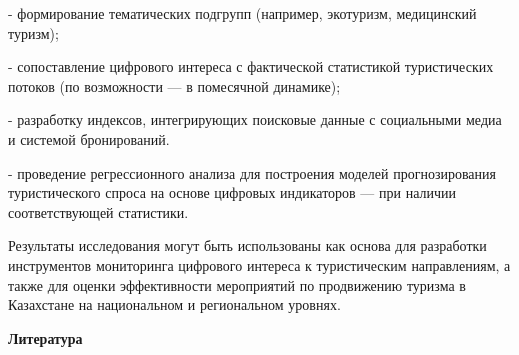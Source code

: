 \begin{multicols}{2}
- формирование тематических подгрупп (например, экотуризм, медицинский
туризм);

- сопоставление цифрового интереса с фактической статистикой
туристических потоков (по возможности --- в помесячной динамике);

- разработку индексов, интегрирующих поисковые данные с социальными
медиа и системой бронирований.

- проведение регрессионного анализа для построения моделей
прогнозирования туристического спроса на основе цифровых индикаторов
--- при наличии соответствующей статистики.

Результаты исследования могут быть использованы как основа для
разработки инструментов мониторинга цифрового интереса к туристическим
направлениям, а также для оценки эффективности мероприятий по
продвижению туризма в Казахстане на национальном и региональном уровнях.
\end{multicols}

\begin{center}
{\bfseries Литература}
\end{center}

